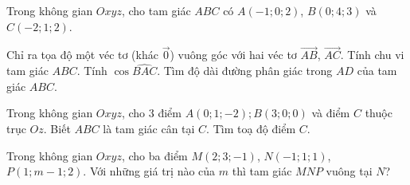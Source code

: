 \begin{vd}
	Trong không gian $Oxyz$, cho tam giác $ABC$ có $A(-1; 0; 2)$, $B(0; 4; 3)$ và $C(-2; 1; 2)$.
	\begin{tasks}
		\task Chỉ ra tọa độ một véc tơ (khác $\vec{0}$) vuông góc với hai véc tơ $\vec{AB}$, $\vec{AC}$.
		\task Tính chu vi tam giác $ABC$.
		\task Tính $\cos \widehat{BAC}$.
		\task Tìm độ dài đường phân giác trong $AD$ của tam giác $ABC$.
	\end{tasks}
\end{vd}
\begin{vd}
	Trong không gian $Oxyz$, cho 3 điểm $A\left(0;1;-2\right);B\left(3;0;0\right)$ và điểm $C$ thuộc trục $Oz$. Biết $ABC$ là tam giác cân tại $C$. Tìm toạ độ điểm $C$.

\end{vd}
\begin{vd}
	Trong không gian $Oxyz$, cho ba điểm $M\left(2;3;-1\right)$, $N\left(-1;1;1\right)$, $P\left(1;m-1;2\right)$. Với những giá trị nào của $m$ thì tam giác $MNP$ vuông tại $N$?
\end{vd}
